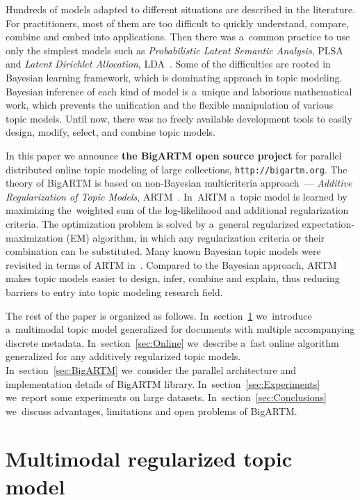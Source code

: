 \documentclass{llncs}
\begin{document}
Hundreds of models adapted to different situations are described in the literature. 
For practitioners, most of them are too difficult to quickly 
understand, compare, combine and embed into applications.
Then there was a~common practice to use only the simplest models such as 
\emph{Probabilistic Latent Semantic Analysis}, PLSA~\cite{hofmann99plsi} and
\emph{Latent Dirichlet Allocation}, LDA~\cite{blei03latent}.
Some of the difficulties are rooted in Bayesian learning framework,
which is dominating approach in topic modeling. 
Bayesian inference of each kind of model is a~unique and laborious mathematical work,
which prevents the unification and the flexible manipulation of various topic models.
Until now, there was no freely available development tools 
to easily design, modify, select, and combine topic models.

In this paper we announce \textbf{the BigARTM open source project} for 
parallel distributed online topic modeling of large collections,
\texttt{http://bigartm.org}.
The theory of BigARTM is based on non-Bayesian multicriteria approach~--- 
\emph{Additive Regularization of Topic Models}, ARTM~\cite{voron14dan-eng}.
In~ARTM a~topic model is learned by maximizing the~weighted sum
of the log-likelihood and additional regularization criteria.
The optimization problem is solved by a~general regularized expectation-maximization (EM) algorithm,
in which any regularization criteria or their combination can be substituted.
Many known Bayesian topic models were revisited in terms of ARTM in~\cite{voron14aist,voron14mlj}.
Compared to the Bayesian approach,
ARTM makes topic models easier to design, infer, combine and explain,
thus reducing barriers to entry into topic modeling research field.

The rest of the paper is organized as follows.
In~section~\ref{sec:Multimodal} 
we~introduce a~multimodal topic model generalized for documents with multiple accompanying discrete metadata. 
In~section~\ref{sec:Online}
we~describe a~fast online algorithm~\cite{hoffman10online} generalized for any additively regularized topic models.
In~section~\ref{sec:BigARTM}
we~consider the parallel architecture and implementation details of BigARTM library.
In~section~\ref{sec:Experiments}
we~report some experiments on large datasets. 
In~section~\ref{sec:Conclusions} 
we~discuss advantages, limitations and open problems of BigARTM.


\section{Multimodal regularized topic model}
\label{sec:Multimodal}
\end{document}
